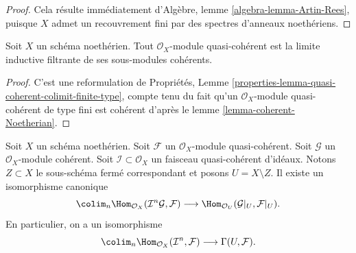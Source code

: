 \begin{proof}
Cela résulte immédiatement
d'Algèbre, lemme \ref{algebra-lemma-Artin-Rees},
puisque $X$ admet un recouvrement fini par des spectres d'anneaux noethériens.
\end{proof}

\begin{lemma}
\label{lemma-directed-colimit-coherent}
Soit $X$ un schéma noethérien. Tout $\mathcal{O}_X$-module
quasi-cohérent est la limite inductive filtrante de ses sous-modules cohérents.
\end{lemma}

\begin{proof}
C'est une reformulation de Propriétés, Lemme
\ref{properties-lemma-quasi-coherent-colimit-finite-type},
compte tenu du fait qu'un
$\mathcal{O}_X$-module quasi-cohérent de type fini est cohérent d'après
le lemme \ref{lemma-coherent-Noetherian}.
\end{proof}

\begin{lemma}
\label{lemma-homs-over-open}
Soit $X$ un schéma noethérien.
Soit $\mathcal{F}$ un $\mathcal{O}_X$-module quasi-cohérent.
Soit $\mathcal{G}$ un $\mathcal{O}_X$-module cohérent.
Soit $\mathcal{I} \subset \mathcal{O}_X$ un faisceau quasi-cohérent d'idéaux.
Notons $Z \subset X$ le sous-schéma fermé correspondant et
posons $U = X \setminus Z$.
Il existe un isomorphisme canonique
$$
\colim_n \Hom_{\mathcal{O}_X}(\mathcal{I}^n\mathcal{G}, \mathcal{F})
\longrightarrow
\Hom_{\mathcal{O}_U}(\mathcal{G}|_U, \mathcal{F}|_U).
$$
En particulier, on a un isomorphisme
$$
\colim_n \Hom_{\mathcal{O}_X}(
\mathcal{I}^n, \mathcal{F})
\longrightarrow
\Gamma(U, \mathcal{F}).
$$
\end{lemma}

